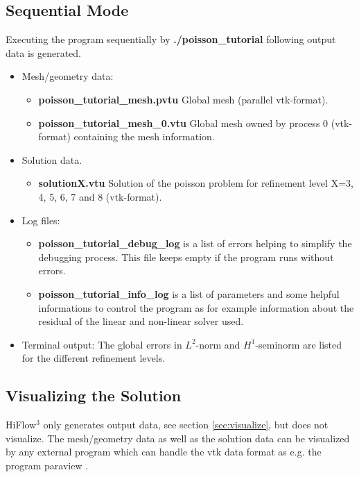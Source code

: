 \documentclass[a4paper, 11pt, twoside]{article}
\begin{document}
\subsection{Sequential Mode} 
Executing the program sequentially by \textbf{./poisson\_tutorial} following output data is generated. 
\begin{itemize}
\item Mesh/geometry data:
\begin{itemize}
\item \textbf{poisson\_tutorial\_mesh.pvtu} Global mesh (parallel vtk-format). 
\item \textbf{poisson\_tutorial\_mesh\_0.vtu} Global mesh owned by process 0 (vtk-format) containing the mesh information.
\end{itemize}
\item Solution data. 
\begin{itemize}
\item \textbf{solutionX.vtu} Solution of the poisson problem for refinement level X=3, 4, 5, 6, 7 and 8 (vtk-format). 
\end{itemize}
\item Log files:
\begin{itemize}
\item \textbf{poisson\_tutorial\_debug\_log} is a list of errors helping to simplify the debugging process. This file keeps empty if the program runs without errors.
\item \textbf{poisson\_tutorial\_info\_log} is a list of parameters and some helpful informations to control the program as for example information 
                                         about the residual of the linear and non-linear solver used.
\end{itemize}
\item Terminal output: The global errors in $L^2$-norm and $H^1$-seminorm are listed for the different refinement levels. 
\end{itemize}

\subsection{Visualizing the Solution}
HiFlow$^3$ only generates output data, see section \ref{sec:visualize}, but does not visualize. The mesh/geometry data as well as the solution data can be visualized 
by any external program which can handle the vtk data format as e.g. the program paraview \cite{Paraview}. 
\end{document}
